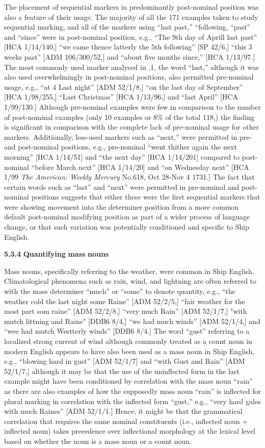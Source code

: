   The placement of sequential markers in predominantly post-nominal position was also a feature of their usage. The majority of all the 171 examples taken to study sequential marking, and all of the markers using “last past,” “following, “past” and “since” were in post-nominal position, e.g., “The 9th day of Aprill last past” [HCA 1/14/140,] “we came thence latterly the 5th following” [SP 42/6,] “this 3 weeks past” [ADM 106/300/52,] and “about five months since,” [HCA 1/13/97.] The most commonly used marker analysed in .1, the word “last,” although it was also used overwhelmingly in post-nominal positions, also permitted pre-nominal usage, e.g., “at 4 Last night” [ADM 52/1/8,] “on the last day of September” [HCA 1/98/255,] “Last Christmas” [HCA 1/13/96,] and “last April” [HCA 1/99/130.] Although pre-nominal examples were few in comparison to the number of post-nominal examples (only 10 examples or 8\% of the total 118,) the finding is significant in comparison with the complete lack of pre-nominal usage for other markers. Additionally, less-used markers such as “next,” were permitted in pre- and post-nominal positions, e.g., pre-nominal “went thither again the next morning” [HCA 1/14/51] and “the next day” [HCA 1/14/201] compared to post-nominal “before March next” [HCA 1/14/20] and “on Wednesday next” [HCA 1/99 \textit{The American: Weekly Mercury} No.618, Oct 28-Nov 4 1731.] The fact that certain words such as “last” and “next” were permitted in pre-nominal and post-nominal positions suggests that either these were the first sequential markers that were showing movement into the determiner position from a more common default post-nominal modifying position as part of a wider process of language change, or that such variation was potentially conditioned and specific to Ship English. 

\textbf{5.3.4} \textbf{Quantifying} \textbf{mass} \textbf{nouns}

Mass nouns, specifically referring to the weather, were common in Ship English. Climatological phenomena such as rain, wind, and lightning are often referred to with the mass determiner “much” or “some” to denote quantity, e.g., “the weather cold the last night some Raine” [ADM 52/2/5,] “fair weather for the most part som raine” [ADM 52/2/8,] “very much Rain” [ADM 52/1/7,] "with mutch littning and Raine" [DDB6 8/4,] “we had much winds” [ADM 52/1/4,] and “wee had mutch Westterly winds” [DDB6 8/4.] The word “gust” referring to a localized strong current of wind although commonly treated as a count noun in modern English appears to have also been used as a mass noun in Ship English, e.g., “blowing hard in gust” [ADM 52/1/7] and “with Gust and Rain” [ADM 52/1/7,] although it may be that the use of the uninflected form in the last example might have been conditioned by correlation with the mass noun “rain” as there are also examples of how the supposedly mass noun “rain” is inflected for plural marking in correlation with the inflected form “gust,” e.g., “very hard gales with much Raines” [ADM 52/1/1.] Hence, it might be that the grammatical correlation that requires the same nominal constituents (i.e., inflected noun + inflected noun) takes precedence over inflectional morphology at the lexical level based on whether the noun is a mass noun or a count noun. 

